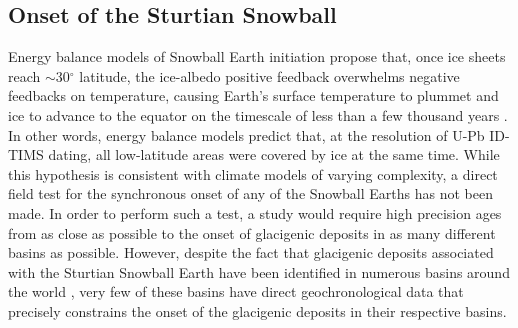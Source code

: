 \documentclass[11pt,letterpaper]{article}
\begin{document}
\subsection*{Onset of the Sturtian Snowball \label{sec:OnsetoftheSturtianSnowball}}

Energy balance models of Snowball Earth initiation propose that, once ice sheets reach $\sim$30$^{\circ}$ latitude, the ice-albedo positive feedback overwhelms negative feedbacks on temperature, causing Earth's surface temperature to plummet and ice to advance to the equator on the timescale of less than a few thousand years \citep{Baum2001a, Hoffman2002a, Pollard2005a}. In other words, energy balance models predict that, at the resolution of U-Pb ID-TIMS dating, all low-latitude areas were covered by ice at the same time. While this hypothesis is consistent with climate models of varying complexity, a direct field test for the synchronous onset of any of the Snowball Earths has not been made. In order to perform such a test, a study would require high precision ages from as close as possible to the onset of glacigenic deposits in as many different basins as possible. However, despite the fact that glacigenic deposits associated with the Sturtian Snowball Earth have been identified in numerous basins around the world \citep{Hoffman2009a}, very few of these basins have direct geochronological data that precisely constrains the onset of the glacigenic deposits in their respective basins.
\end{document}
